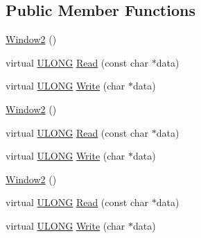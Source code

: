 \subsection*{Public Member Functions}
\begin{DoxyCompactItemize}
\item 
\hyperlink{struct_y_excel_1_1_worksheet_1_1_window2_a5618e3a35f63f57c6dce259ed498e657}{Window2} ()
\item 
virtual \hyperlink{_basic_excel_8hpp_abe09d1bea023be6a07cbadde8e955435}{U\+L\+O\+N\+G} \hyperlink{struct_y_excel_1_1_worksheet_1_1_window2_a71300bb8403cfe8e1cb6b5c3db1dae07}{Read} (const char $\ast$data)
\item 
virtual \hyperlink{_basic_excel_8hpp_abe09d1bea023be6a07cbadde8e955435}{U\+L\+O\+N\+G} \hyperlink{struct_y_excel_1_1_worksheet_1_1_window2_a84bac5b2634b4734e17ca951130fe6e1}{Write} (char $\ast$data)
\item 
\hyperlink{struct_y_excel_1_1_worksheet_1_1_window2_a5618e3a35f63f57c6dce259ed498e657}{Window2} ()
\item 
virtual \hyperlink{_basic_excel_8hpp_abe09d1bea023be6a07cbadde8e955435}{U\+L\+O\+N\+G} \hyperlink{struct_y_excel_1_1_worksheet_1_1_window2_a10dee9a152e441887eab63ba3f6eb4d9}{Read} (const char $\ast$data)
\item 
virtual \hyperlink{_basic_excel_8hpp_abe09d1bea023be6a07cbadde8e955435}{U\+L\+O\+N\+G} \hyperlink{struct_y_excel_1_1_worksheet_1_1_window2_a76ff38395ad53c48e20b515e1bd7fdbe}{Write} (char $\ast$data)
\item 
\hyperlink{struct_y_excel_1_1_worksheet_1_1_window2_a5618e3a35f63f57c6dce259ed498e657}{Window2} ()
\item 
virtual \hyperlink{_basic_excel_8hpp_abe09d1bea023be6a07cbadde8e955435}{U\+L\+O\+N\+G} \hyperlink{struct_y_excel_1_1_worksheet_1_1_window2_a10dee9a152e441887eab63ba3f6eb4d9}{Read} (const char $\ast$data)
\item 
virtual \hyperlink{_basic_excel_8hpp_abe09d1bea023be6a07cbadde8e955435}{U\+L\+O\+N\+G} \hyperlink{struct_y_excel_1_1_worksheet_1_1_window2_a76ff38395ad53c48e20b515e1bd7fdbe}{Write} (char $\ast$data)
\end{DoxyCompactItemize}
